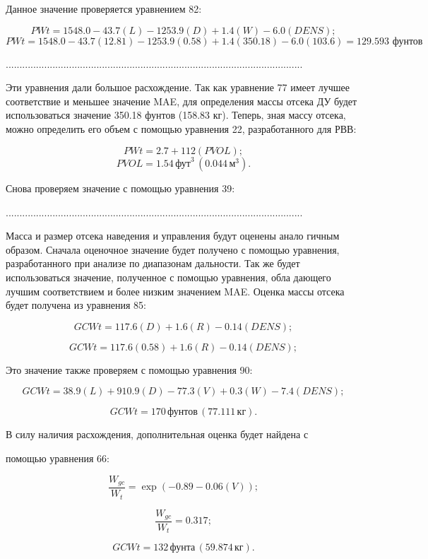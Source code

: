 \documentclass[a4paper,12pt]{report}
\begin{document}
Данное значение проверяется уравнением 82:

\[ \textit{PWt} = 1548.0 - 43.7(L) - 1253.9(D) + 1.4(W) - 6.0(\textit{DENS}); \]
\[ \textit{PWt} = 1548.0 - 43.7(12.81) - 1253.9(0.58) + 1.4(350.18) - 6.0(103.6) = 129.593 \text{ фунтов} \]

............................................................................................................

Эти уравнения дали большое расхождение. Так как уравнение
77 имеет лучшее соответствие и меньшее значение MAE, для определения
массы отсека ДУ будет использоваться значение 350.18 фунтов (158.83 кг).
Теперь, зная массу отсека, можно определить его объем с помощью уравнения 22, разработанного для РВВ:

\[ \textit{PWt} = 2.7 + 112(\textit{PVOL}); \]
\[ \textit{PVOL} = 1.54 \, \text{фут}^3 \, (0.044 \, \text{м}^3). \]

Снова проверяем значение с помощью уравнения 39:

............................................................................................................

 Масса и размер отсека наведения и управления будут оценены анало
гичным образом. Сначала оценочное значение будет получено с помощью
 уравнения, разработанного при анализе по диапазонам дальности. Так же
 будет использоваться значение, полученное с помощью уравнения, обла
дающего лучшим соответствием и более низким значением MAE. Оценка
 массы отсека будет получена из уравнения 85:

\[ GCWt = 117.6(D) + 1.6(R) - 0.14(\textit{DENS}); \]

\[ GCWt = 117.6(0.58) + 1.6(R) - 0.14(\textit{DENS}); \]


Это значение также проверяем с помощью уравнения 90:

\[ GCWt = 38.9(L) + 910.9(D) - 77.3(V) + 0.3(W) - 7.4(\textit{DENS}); \]

\[ GCWt = 170 \, \text{фунтов} \, (77.111 \, \text{кг}). \]

В силу наличия расхождения, дополнительная оценка будет найдена с

помощью уравнения 66:

\[ \frac{W_{gc}}{W_t} = \exp(-0.89 - 0.06(V)); \]

\[ \frac{W_{gc}}{W_t} = 0.317; \]

\[ GCWt = 132 \, \text{фунта} \, (59.874 \, \text{кг}). \]
\end{document}
